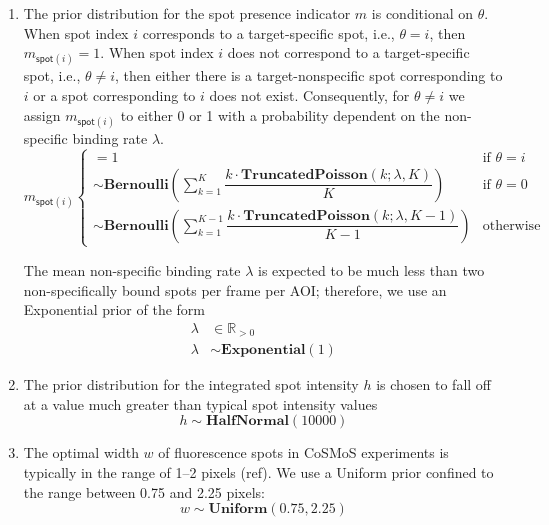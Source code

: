 \begin{enumerate}
\item The prior distribution for the spot presence indicator $m$ is conditional on $\theta$. When spot index $i$ corresponds to a target-specific spot, i.e., $\theta = i$, then $m_{\mathsf{spot}(i)} = 1$. When spot index $i$ does not correspond to a target-specific spot, i.e., $\theta \neq i$, then either there is a target-nonspecific spot corresponding to $i$ or a spot corresponding to $i$ does not exist. Consequently, for $\theta \neq i$ we assign $m_{\mathsf{spot}(i)}$ to either 0 or 1 with a probability dependent on the non-specific binding rate $\lambda$.
%
\begin{equation}
    m_{\mathsf{spot}(i)}
    \begin{cases}
         = 1 & \text{if $\theta = i$} \\
        \sim \mathbf{Bernoulli} \left( \sum_{k=1}^K \dfrac{k \cdot \mathbf{TruncatedPoisson}(k; \lambda, K)}{K} \right) & \text{if $\theta = 0$} \\
        \sim \mathbf{Bernoulli} \left( \sum_{k=1}^{K-1} \dfrac{k \cdot \mathbf{TruncatedPoisson}(k; \lambda, K-1)}{K-1} \right) & \text{otherwise}
    \end{cases}
\end{equation}

\noindent
The mean non-specific binding rate $\lambda$ is expected to be much less than two non-specifically bound spots per frame per AOI; therefore, we use an Exponential prior of the form
%
\begin{subequations}
\begin{align}
    \lambda &\in \mathbb{R}_{>0} \\
    \lambda &\sim \mathbf{Exponential}(1)
\end{align}
\end{subequations}

\item The prior distribution for the integrated spot intensity $h$ is chosen to fall off at a value much greater than typical spot intensity values 
%
\begin{equation}
    h \sim \mathbf{HalfNormal}(10000)
\end{equation}

\item The optimal width $w$ of fluorescence spots in CoSMoS experiments is typically in the range of 1--2 pixels (ref). We use a Uniform prior confined to the range between 0.75 and 2.25 pixels:
%
\begin{equation}
    w \sim \textbf{Uniform}(0.75, 2.25)
\end{equation}


\end{enumerate}
